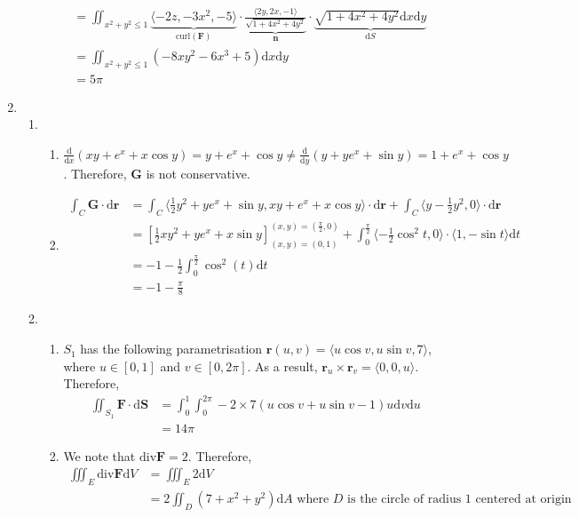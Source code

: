 \documentclass[12pt]{article}
\newcommand{\diff}{\mathrm{d}}
\theoremstyle{definition}
\begin{document}
\begin{enumerate}
\begin{enumerate}
\begin{align*}
&=\iint_{x^2+y^2\leq 1}\underbrace{\langle -2z,-3x^2,-5\rangle}_{\text{curl}(\mathbf{F})} \cdot \underbrace{\frac{\langle 2y,2x,-1\rangle}{\sqrt{1+4x^2+4y^2}}}_{\mathbf{n}}\cdot \underbrace{\sqrt{1+4x^2+4y^2}\diff x\diff y}_{\diff S}\\
&=\iint_{x^2+y^2\leq 1}(-8xy^2-6x^3+5)\diff x\diff y\\
&=5\pi
    \end{align*}
  \end{enumerate}
  \item \begin{enumerate}
  \item \begin{enumerate}
    \item $\frac{\diff }{\diff x}(xy+e^x+x\cos y)=y+e^x+\cos y\neq \frac{\diff}{\diff y}(y+ye^x+\sin y)=1+e^x+\cos y$. Therefore, $\mathbf{G}$ is not conservative.
    \item \begin{align*}
    \int_C\mathbf{G}\cdot\diff\mathbf{r}&=\int_C\langle \frac{1}{2}y^2+ye^x+\sin y,xy+e^x+x\cos y\rangle\cdot \diff\mathbf{r}+\int_C\langle y-\frac{1}{2}y^2, 0\rangle \cdot\diff\mathbf{r}\\
    &=[\frac{1}{2}xy^2+ye^x+x\sin y]^{(x,y)=(\frac{\pi}{2}, 0)}_{(x,y)=(0,1)}+\int_0^\frac{\pi}{2}\langle -\frac{1}{2}\cos^2 t, 0 \rangle\cdot \langle 1, -\sin t\rangle \diff t\\
    &=-1-\frac{1}{2}\int_0^\frac{\pi}{2}\cos^2(t)\diff t\\
    &=-1-\frac{\pi}{8}
    \end{align*}
  \end{enumerate}
  \item \begin{enumerate}
  \item $S_1$ has the following parametrisation $\mathbf{r}(u,v)=\langle u\cos v, u\sin v, 7\rangle$, where $u\in[0,1]$ and $v\in[0, 2\pi]$. As a result, $\mathbf{r}_u\times\mathbf{r}_v=\langle 0,0,u\rangle$. Therefore,
  \begin{align*}
  \iint_{S_1}\mathbf{F}\cdot\diff\mathbf{S}&=\int_0^1\int_0^{2\pi} -2\times 7(u\cos v+u\sin v-1)u\diff v\diff u\\
  &=14\pi
  \end{align*}
  \item We note that $\text{div}\mathbf{F}=2$. Therefore,
  \begin{align*}
  \iiint_E\text{div}\mathbf{F}\diff V &= \iiint_E 2\diff V\\
  &=2\iint_D(7+x^2+y^2)\diff A\text{ where }D\text{ is the circle of radius 1 centered at origin}\\

\end{align*}
\end{enumerate}
\end{enumerate}
\end{enumerate}
\end{document}
